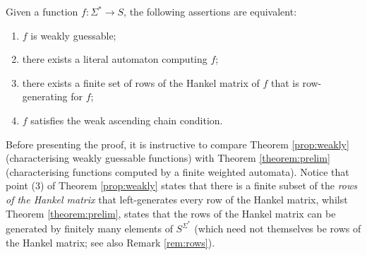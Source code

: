\documentclass{lmcs}
\numberwithin{theorem}{section}
\begin{document}
\begin{thm}
\label{prop:weakly}
Given a function $f:\Sigma^* \to S$, the following assertions are equivalent:
\begin{enumerate}
\item $f$ is weakly guessable;
\item there exists a literal automaton computing $f$;
\item there exists a finite set of rows of the Hankel matrix of $f$ that is row-generating for $f$;
\item $f$ satisfies the weak ascending chain condition.
\end{enumerate}  
\end{thm}

\begin{rem}
	\label{rem:rows2}
    Before presenting the proof, it is instructive to  compare Theorem \ref{prop:weakly} (characterising weakly guessable functions) with Theorem \ref{theorem:prelim} (characterising functions computed by a finite weighted automata). Notice that point (3) of Theorem \ref{prop:weakly} states that there is a finite subset of the \emph{rows of the Hankel matrix} that left-generates every row of the Hankel matrix, whilst Theorem \ref{theorem:prelim}, states that the rows of the Hankel matrix can be generated by finitely many elements of $S^{\Sigma^*}$ (which need not themselves be rows of the Hankel matrix; see also Remark \ref{rem:rows}).
\end{rem}
\end{document}
